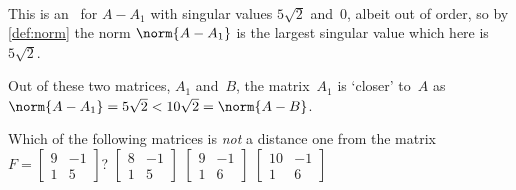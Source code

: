 \begin{example}
\begin{enumerate}
\begin{enumerate}
\begin{solution}
\begin{eqnarray*}
\end{eqnarray*}
This is an \svd\ for \(A-A_1\) with singular values \(5\sqrt2\) and~\(0\), albeit out of order, so by \autoref{def:norm} the norm \(\norm{A-A_1}\) is the largest singular value which here is~\(5\sqrt2\).
\end{solution}
\end{enumerate}
Out of these two matrices, \(A_1\) and~\(B\), the matrix~\(A_1\) is `closer' to~\(A\) as \(\norm{A-A_1}=5\sqrt2<10\sqrt2=\norm{A-B}\).
\end{enumerate}
\end{example}




\begin{activity}
Which of the following matrices is \emph{not} a distance one from the matrix \(F=\begin{bmatrix} 9&-1\\1&5 \end{bmatrix}\)?
{\(\begin{bmatrix} 8&-1\\1&5 \end{bmatrix}\)}
{\(\begin{bmatrix} 9&-1\\1&6 \end{bmatrix}\)}
{\(\begin{bmatrix} 10&-1\\1&6 \end{bmatrix}\)}
\end{activity}




